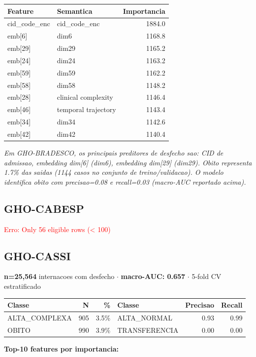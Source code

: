 \documentclass[11pt,a4paper]{article}
\begin{document}
\begin{tabular}{llr}
\toprule
Feature & Semantica & Importancia \\
\midrule
cid\_code\_enc & cid\_code\_enc & 1884.0 \\
emb[6] & dim6 & 1168.8 \\
emb[29] & dim29 & 1165.2 \\
emb[24] & dim24 & 1163.2 \\
emb[59] & dim59 & 1162.2 \\
emb[58] & dim58 & 1148.2 \\
emb[28] & clinical complexity & 1146.4 \\
emb[46] & temporal trajectory & 1143.4 \\
emb[34] & dim34 & 1142.6 \\
emb[42] & dim42 & 1140.4 \\
\bottomrule
\end{tabular}

\vspace{4pt}\noindent\textit{Em GHO-BRADESCO, os principais preditores de desfecho sao: CID de admissao, embedding dim[6] (dim6), embedding dim[29] (dim29). Obito representa 1.7\% das saidas (1144 casos no conjunto de treino/validacao). O modelo identifica obito com precisao=0.08 e recall=0.03 (macro-AUC reportado acima).}

\subsection{GHO-CABESP}
\textcolor{red}{Erro: Only 56 eligible rows (< 100)}

\subsection{GHO-CASSI}
\textbf{n=25,564} internacoes com desfecho $\cdot$ \textbf{macro-AUC: 0.657} $\cdot$ 5-fold CV estratificado

\begin{tabular}{lrr|lrr}
\toprule
Classe & N & \% & Classe & Precisao & Recall \\
\midrule
ALTA\_COMPLEXA & 905 & 3.5\% & ALTA\_NORMAL & 0.93 & 0.99 \\
OBITO & 990 & 3.9\% & TRANSFERENCIA & 0.00 & 0.00 \\
\bottomrule
\end{tabular}

\vspace{4pt}\noindent\textbf{Top-10 features por importancia:}
\end{document}
